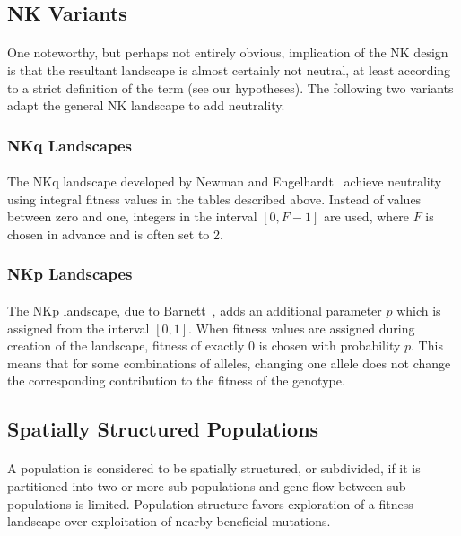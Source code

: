 \documentclass[12pt,letterpaper,titlepage]{article}
\begin{document}
\subsection{NK Variants}

\paragraph{}
One noteworthy, but perhaps not entirely obvious, implication of the NK design
is that the resultant landscape is almost certainly not neutral, at least
according to a strict definition of the term (see our hypotheses). The
following two variants adapt the general NK landscape to add neutrality.

\subsubsection{NKq Landscapes}

\paragraph{}
The NKq landscape developed by Newman and Engelhardt~\cite{Newman1998} achieve
neutrality using integral fitness values in the tables described above. Instead
of values between zero and one, integers in the interval $\left[0,F-1\right]$
are used, where $F$ is chosen in advance and is often set to 2.

\subsubsection{NKp Landscapes}

\paragraph{}
The NKp landscape, due to Barnett~\cite{Barnett1998}, adds an additional
parameter $p$ which is assigned from the interval $\left[0,1\right]$. When
fitness values are assigned during creation of the landscape, fitness of
exactly 0 is chosen with probability $p$. This means that for some combinations
of alleles, changing one allele does not change the corresponding contribution
to the fitness of the genotype.

\subsection{Spatially Structured Populations}

\paragraph{}
A population is considered to be spatially structured, or subdivided, if it is
partitioned into two or more sub-populations and gene flow between
sub-populations is limited. Population structure favors exploration of a
fitness landscape over exploitation of nearby beneficial mutations.
\end{document}
